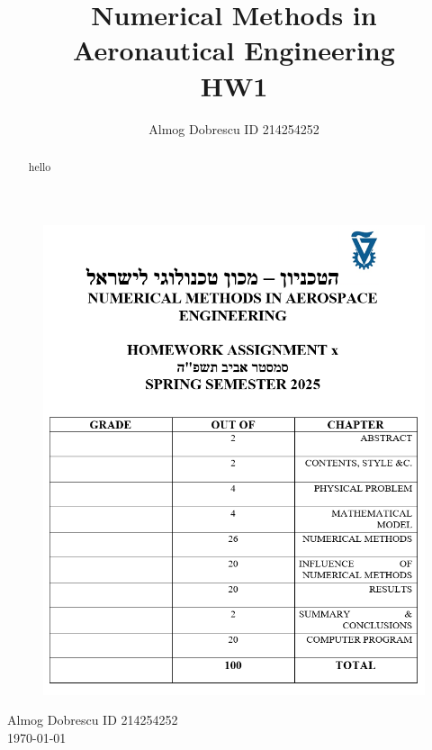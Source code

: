 \documentclass[11pt, a4paper]{article}
\title{Numerical Methods in Aeronautical Engineering \\ HW1}
\author{Almog Dobrescu ID 214254252}
\begin{document}
\thispagestyle{empty}
\begin{figure}[H]
    \centering
    \includegraphics[width=\textwidth]{./../../../Cover page for computational assignments 2025.png}
    \label{fig: cover page}
\end{figure}
\begin{center}
    \Huge
    Almog Dobrescu \qquad ID 214254252 \\ \vspace{0.5cm}
    \today
\end{center}
\newpage

\begin{abstract}
    hello
\end{abstract}

\tableofcontents
\vfil
\listoffigures
\newpage

\printnomenclature
\newpage
\end{document}
